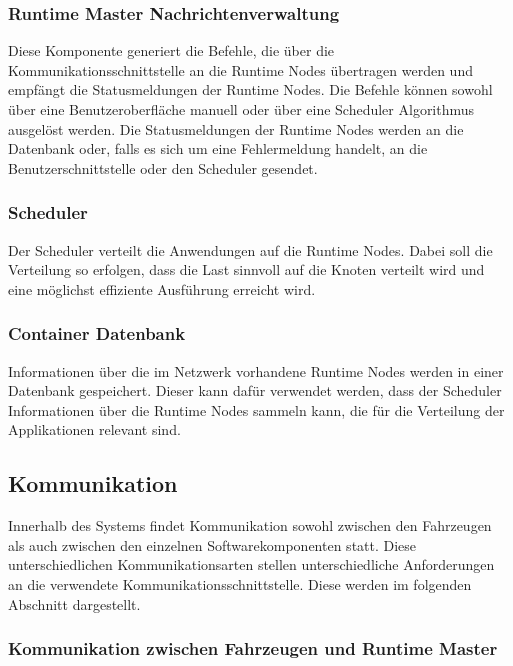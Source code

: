 \subsubsection{Runtime Master Nachrichtenverwaltung}

Diese Komponente generiert die Befehle, die über die Kommunikationsschnittstelle an die Runtime Nodes übertragen werden und empfängt die Statusmeldungen der Runtime Nodes. Die Befehle können sowohl über eine Benutzeroberfläche manuell oder über eine Scheduler Algorithmus ausgelöst werden. Die Statusmeldungen der Runtime Nodes werden an die Datenbank oder, falls es sich um eine Fehlermeldung handelt, an die Benutzerschnittstelle oder den Scheduler gesendet. 

\subsubsection{Scheduler}

Der Scheduler verteilt die Anwendungen auf die Runtime Nodes. Dabei soll die Verteilung so erfolgen, dass die Last sinnvoll auf die Knoten verteilt wird und eine möglichst effiziente Ausführung erreicht wird. 

\subsubsection{Container Datenbank}

 Informationen über die im Netzwerk vorhandene Runtime Nodes werden in einer Datenbank gespeichert. Dieser kann dafür verwendet werden, dass der Scheduler Informationen über die Runtime Nodes sammeln kann, die für die Verteilung der Applikationen relevant sind. 

\subsection{Kommunikation}
\label{Kommunikation}

Innerhalb des Systems findet Kommunikation sowohl zwischen den Fahrzeugen als auch zwischen den einzelnen Softwarekomponenten statt. Diese unterschiedlichen Kommunikationsarten stellen unterschiedliche Anforderungen an die verwendete Kommunikationsschnittstelle. Diese werden im folgenden Abschnitt dargestellt.

\subsubsection{Kommunikation zwischen Fahrzeugen und Runtime Master}
\label{Kommunikation zwischen Fahrzeugen und Runtime Master}

